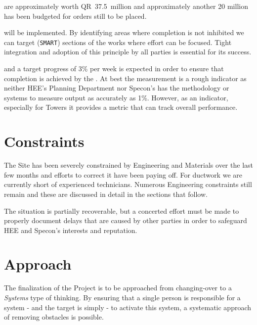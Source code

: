  are approximately worth QR~37.5~million and approximately another 20 million has been budgeted for orders still to be placed. 

 will be implemented. By identifying areas where completion is not inhibited we can target ({\tt{SMART}}) 
sections of the works where effort can be focused.  Tight integration and adoption of this principle by all parties is essential for its success. 

 and a target progress of 3\% per week is expected in order to ensure that completion is achieved by the \deadline. At best the measurement is a rough indicator as neither HEE's Planning Department nor Specon's has the methodology or systems to measure output as accurately as 1\%. However, as an indicator, especially for Towers it provides a metric that can track overall performance.


\section{Constraints}
The Site has been severely constrained by Engineering and Materials over the last few months and efforts to correct it have been paying off. For ductwork we are currently short of experienced technicians. Numerous Engineering constraints still remain and these are discussed in detail in the sections that follow.

The situation is partially recoverable, but a concerted effort must be made to 
properly document delays that are caused by other parties in order to safeguard HEE and Specon's interests and reputation. 

\section{Approach}

The finalization of the Project is to be approached from changing-over to a {\em Systems} type of thinking.   By ensuring that a single person is responsible for a system - and the target is simply - to activate this system, a systematic approach of removing obstacles is possible. 

